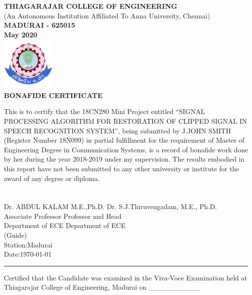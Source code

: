 \documentclass[a4paper,12pt]{report} %
\begin{document}
\thispagestyle{plain}
\setcounter{page}{2}
\begin{center}
     \Large\textbf{THIAGARAJAR COLLEGE OF ENGINEERING}\\
       \normalsize (An Autonomous Institution Affiliated To Anna University, Chennai)\\
        \Large\textbf{MADURAI - 625015}\\
       \large \textbf{May 2020}\\
   \includegraphics[width=0.2\textwidth]{TCE}\\
    \vspace{0.3cm}
    \large
   \Large\textbf{BONAFIDE CERTIFICATE}
   
\end{center}
\normalsize

   This is to certify that the 18CN280 Mini Project entitled “SIGNAL PROCESSING ALGORITHM FOR RESTORATION OF CLIPPED SIGNAL IN SPEECH RECOGNITION SYSTEM”, being submitted by J.JOHN SMITH (Register Number 18N099) in partial fulfillment for the requirement of Master of Engineering Degree in Communication Systems, is a record of bonafide work done by her during the year 2018-2019 under my supervision. The results embodied in this report have not been submitted to any other university or institute for the award of any degree or diploma.\\\\\\
 \hfill
 Dr. ABDUL KALAM M.E.,Ph.D.
 \hfill
Dr. S.J.Thiruvengadam, M.E., Ph.D. \\
 Associate Professor
 \hfill Professor and Head\\
 Department of ECE
 \hfill  Department of ECE\\
 (Guide)\\
 Station:Madurai\\
 Date:\today
\par\noindent\rule{\textwidth}{0.4pt}
 Certified that the Candidate was examined in the Viva-Voce Examination held at Thiagarajar College of Engineering, Madurai on \_\_\_\_\_\_\_\_\_\_\\\\
 
\end{document}
